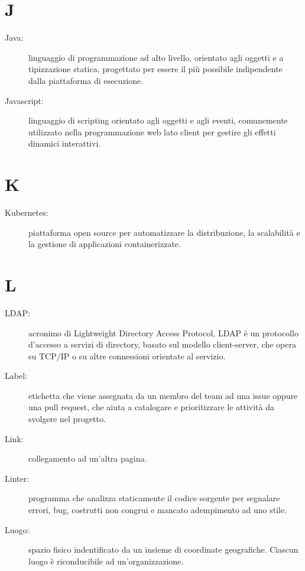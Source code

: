 \documentclass{article}
\begin{document}
  \section{J}
  \begin{description}
    \item[Java:] linguaggio di programmazione ad alto livello, orientato agli oggetti e a tipizzazione statica, progettato per essere il più possibile indipendente dalla piattaforma di esecuzione.
    \item[Javascript:] linguaggio di scripting orientato agli oggetti e agli eventi, comunemente utilizzato nella programmazione web lato client per gestire gli effetti dinamici interattivi.
  \end{description}
  \newpage
  \section{K}
  \begin{description}
    \item[Kubernetes:] piattaforma open source per automatizzare la distribuzione, la scalabilità e la gestione di applicazioni containerizzate.
  \end{description}
  \newpage
  \section{L}
  \begin{description}
    \item[LDAP:] acronimo di Lightweight Directory Access Protocol, LDAP è un protocollo d'accesso a servizi di directory, basato sul modello client-server, che opera su TCP/IP o su altre connessioni orientate al servizio.
    \item[Label:] etichetta che viene assegnata da un membro del team ad una issue oppure una pull request, che aiuta a catalogare e prioritizzare le attività da svolgere nel progetto.
    \item[Link:] collegamento ad un'altra pagina.
    \item[Linter:] programma che analizza staticamente il codice sorgente per segnalare errori, bug, costrutti non congrui e mancato adempimento ad uno stile.
    \item[Luogo:] spazio fisico indentificato da un insieme di coordinate geografiche. Ciascun luogo è riconducibile ad un'organizzazione.
  \end{description}
  \newpage
\end{document}
